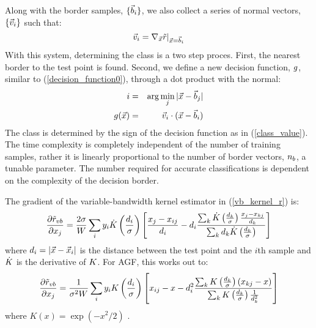 \documentclass[11pt]{article}
\begin{document}
Along with the border samples,  $\lbrace \vec b_i \rbrace$, we also
collect a series of normal vectors, $\lbrace \vec v_i \rbrace$
such that:
\begin{equation}
\vec v_i=\nabla_{\vec {x}}{\tilde r |_{\vec {x}=\vec b_i}}
\end{equation}
With this system, determining the class is a two step proces.
First, the nearest border to the test point is found.
Second, we define a new decision function, $g$, 
similar to (\ref{decision_function0}), through a dot product with the normal:
\begin{eqnarray}
	i & = & \arg \min_j |\vec {x} - \vec b_j| \\ \nonumber
	g(\vec {x}) & = & \vec v_i \cdot (\vec {x} - \vec b_i)
	\label{border_decision}
\end{eqnarray}
The class is determined by the sign of the decision function as in 
(\ref{class_value}).
The time complexity is completely independent of the number
of training samples, rather it is linearly proportional to the number of
border vectors, $n_b$, a tunable parameter. The number required for
accurate classifications is dependent on the complexity of the decision
border.

The gradient of the variable-bandwidth kernel estimator in 
(\ref{vb_kernel_r}) is:
\begin{equation}
	\frac{\partial \tilde r_{vb}}{\partial x_j} = 
	\frac{2 \sigma}{W} \sum_i y_i
	\dot {K} \left (\frac{d_i}{\sigma} \right )
	\left [\frac{x_j - x_{ij}}{d_i} 
	- d_i \frac{\sum_k \dot {K} \left (\frac{d_k}{\sigma} \right )
	\frac{x_j - x_{kj}}{d_k}}
{\sum_k d_k \dot {K} \left (\frac{d_k}{\sigma} \right )} \right ]
\end{equation}
where $d_i=|\vec {x} - \vec {x}_i|$ is the distance between the 
test point and the $i$th sample and $\dot {K}$ is the derivative
of $K$.
For AGF, this works out to:
\begin{equation}
	\frac{\partial \tilde r_{vb}}{\partial x_j} = 
	\frac{1}{\sigma^2 W} \sum_i y_i
	K \left (\frac{d_i}{\sigma} \right )
	\left [x_{ij} - x
	- d_i^2 \frac{\sum_k K \left (\frac{d_k}{\sigma} \right )
	\left (x_{kj} - x \right )}
{\sum_k K \left (\frac{d_k}{\sigma} \right )\frac{1}{d_k^2}} \right ]
\end{equation}
where $K(x)=\exp(-x^2/2)$ \citep{Mills2011}.
\end{document}
